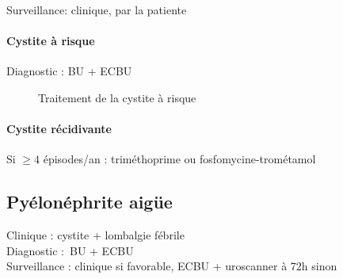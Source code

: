 \documentclass{article}
\begin{document}
Surveillance: clinique, par la patiente

\paragraph{Cystite à risque}
Diagnostic : BU + ECBU

\begin{figure}[htpb]
  \centering

  \caption{Traitement de la cystite à risque}
\end{figure}

\paragraph{Cystite récidivante}%
\label{ssub:cystite_recidivante}

Si $\ge 4$ épisodes/an : triméthoprime ou fosfomycine-trométamol

\subsection{Pyélonéphrite aigüe}%
\label{sub:pyelonephite_aigue}
Clinique : cystite + lombalgie fébrile\\
Diagnostic : BU + ECBU\\
Surveillance : clinique si favorable, ECBU + uroscanner à 72h sinon
\end{document}
